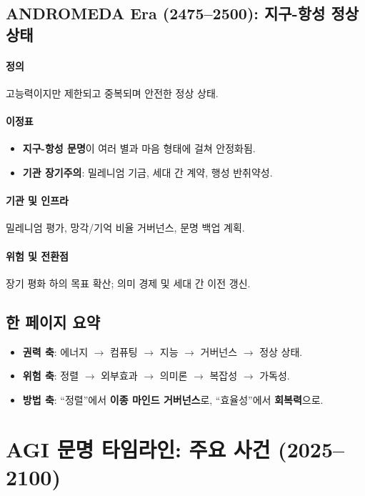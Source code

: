 \documentclass[11pt]{article}
\begin{document}
\subsection{ANDROMEDA Era (2475–2500): 지구-항성 정상 상태}
\paragraph{정의} 고능력이지만 제한되고 중복되며 안전한 정상 상태.

\paragraph{이정표}
\begin{itemize}[noitemsep]
  \item \textbf{지구-항성 문명}이 여러 별과 마음 형태에 걸쳐 안정화됨.
  \item \textbf{기관 장기주의}: 밀레니엄 기금, 세대 간 계약, 행성 반취약성.
\end{itemize}

\paragraph{기관 및 인프라} 밀레니엄 평가, 망각/기억 비율 거버넌스, 문명 백업 계획.

\paragraph{위험 및 전환점} 장기 평화 하의 목표 확산; 의미 경제 및 세대 간 이전 갱신.

\subsection{한 페이지 요약}
\begin{itemize}[noitemsep]
  \item \textbf{권력 축}: 에너지 $\rightarrow$ 컴퓨팅 $\rightarrow$ 지능 $\rightarrow$ 거버넌스 $\rightarrow$ 정상 상태.
  \item \textbf{위험 축}: 정렬 $\rightarrow$ 외부효과 $\rightarrow$ 의미론 $\rightarrow$ 복잡성 $\rightarrow$ 가독성.
  \item \textbf{방법 축}: ``정렬''에서 \textbf{이종 마인드 거버넌스}로, ``효율성''에서 \textbf{회복력}으로.
\end{itemize}

\newpage

\section{AGI 문명 타임라인: 주요 사건 (2025–2100)}
\label{appendix:timeline}
\end{document}
